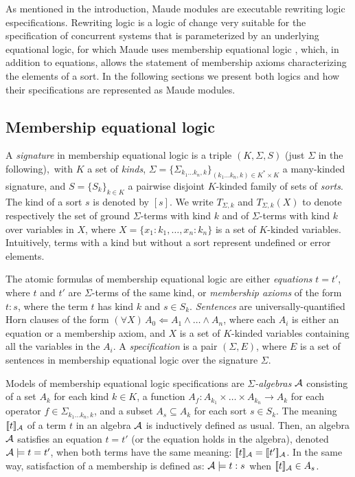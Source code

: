 
As mentioned in the introduction, Maude modules are executable rewriting logic especifications.
Rewriting logic \cite{Meseguer92-tcs} is a logic of change very suitable
for the specification of concurrent systems that is parameterized
by an underlying equational logic, for which Maude uses membership
equational logic \cite{BouhoulaJouannaudMeseguer00,Meseguer97},
which, in addition to equations, allows the statement of membership
axioms characterizing the elements of a sort. In the following sections we
present both logics and how their specifications are represented as Maude modules.

\subsection{Membership equational logic} \label{mel-section}

A \emph{signature} in membership equational logic is a triple $(K,\Sigma, S)$
(just $\Sigma$ in the following),\
with $K$ a set of {\em kinds},
$\Sigma = \{\Sigma_{k_1\ldots k_n,k}\}_{(k_1\ldots k_n,k)\in K^{*}\times K}$ a
many-kinded signature, and $S =
\{S_{k}\}_{k\in K}$ a pairwise disjoint $K$-kinded family of sets of
\emph{sorts}.
The kind of a sort $s$ is denoted by $[s]$.
We write $T_{\Sigma,k}$ and $T_{\Sigma,k}(X)$ to denote respectively the set
of ground
$\Sigma$-terms with kind $k$ and of $\Sigma$-terms with kind $k$ over variables
in $X$, where $X = \{ x_1:k_1, \dots, x_n:k_n\}$ is a set of $K$-kinded
variables.
Intuitively, terms with a kind but without a sort represent undefined or error
elements.

The atomic formulas of membership equational logic are either \emph{equations}
$t = t'$, where $t$ and $t'$ are $\Sigma$-terms of the same kind, or
\emph{membership axioms} of the form $t : s$, where the term $t$
has kind $k$ and $s \in S_k$.
\emph{Sentences} are universally-quantified Horn clauses of the
form $(\forall X)\, A_0 \Leftarrow A_1 \wedge \ldots \wedge A_n$,
where each $A_i$ is  either an equation or a membership axiom, and $X$ is a
set of $K$-kinded variables containing all the variables in the $A_i$.
A \emph{specification} is a pair $(\Sigma,E)$, where $E$ is a set
of sentences in membership equational logic over the signature $\Sigma$.

Models of membership equational logic specifications are
\emph{$\Sigma$-algebras} $\mathcal{A}$ consisting of a set $A_k$ for each kind $k \in K$,
a function $A_f : A_{k_1}\times \dots \times A_{k_n} \longrightarrow A_k$ for each 
operator $f \in \Sigma_{k_1 \dots k_n, k}$, and
a subset $A_s \subseteq A_k$ for each sort $s\in S_k$. The meaning
$[\![t]\!]_{\mathcal{A}}$ of a term $t$ in an algebra $\mathcal{A}$ is inductively defined as usual.
Then, an algebra $\mathcal{A}$ satisfies an equation $t = t'$  (or the equation holds
in the algebra), denoted $\mathcal{A} \models t = t'$, when both terms have the same meaning:
$[\![t]\!]_{\mathcal{A}} = [\![t']\!]_{\mathcal{A}}$. In the same way, satisfaction of a membership is defined as:
$\mathcal{A} \models t : s$ when $[\![t]\!]_{\mathcal{A}} \in A_s$.

